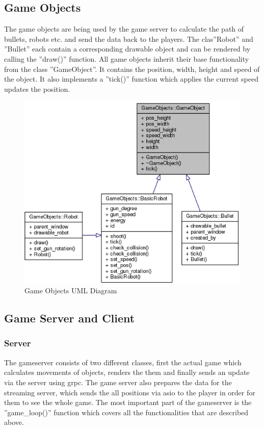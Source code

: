 \documentclass[12pt]{report}
\begin{document}
\subsection{Game Objects}
The game objects are being used by the game server to calculate the path of bullets, robots etc. and send the data back to the players. The clas''Robot'' and ''Bullet'' each contain a corresponding drawable object and can be rendered by calling the ''draw()'' function. All game objects inherit their base functionality from the class ''GameObject''. It contains the position, width, height and speed of the object. It also implements a ''tick()'' function which applies the current speed updates the position.

\begin{figure}[h]
\centering
\includegraphics[scale = 0.7]{GameObjects_graph.png}
\caption{Game Objects UML Diagram}
\medskip
\end{figure}

\clearpage

\subsection{Game Server and Client}

\subsubsection{Server}
The gameserver consists of two different classes, first the actual game which calculates movements of objects, renders the them and finally sends an update via the server using grpc. The game server also prepares the data for the streaming server, which sends the all positions via asio to the player in order for them to see the whole game. The most important part of the gameserver is the ''game\_loop()'' function which covers all the functionalities that are described above.
\end{document}
